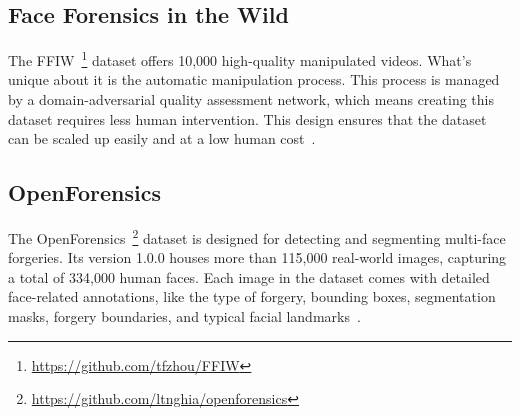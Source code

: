 \subsection{Face Forensics in the Wild}
The \ac{FFIW}~\footnote{\url{https://github.com/tfzhou/FFIW}} dataset offers 10,000 high-quality
manipulated videos. What's unique about it is the automatic manipulation process. This
process is managed by a domain-adversarial quality assessment network, which means creating
this dataset requires less human intervention. This design ensures that the dataset can
be scaled up easily and at a low human cost~\cite{Zhou_2021_CVPR}.

\subsection{OpenForensics}
The OpenForensics~\footnote{\url{https://github.com/ltnghia/openforensics}} dataset is
designed for detecting and segmenting multi-face forgeries.
Its version 1.0.0 houses more than 115,000 real-world images, capturing a total of 334,000 human faces.
Each image in the dataset comes with detailed face-related annotations, like the type
of forgery, bounding boxes, segmentation masks, forgery boundaries, and typical facial
landmarks~\cite{ltnghia-ICCV2021}.


